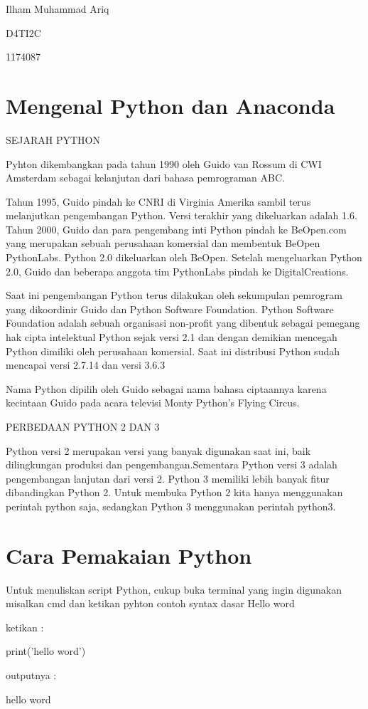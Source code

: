 \documentclass{article}
\begin{document}
Ilham Muhammad Ariq 
\par
D4TI2C
\par
1174087
\section{Mengenal Python dan Anaconda}
\begin{enumerate}
    \item 
{SEJARAH PYTHON}
\par
{Pyhton dikembangkan pada tahun 1990 oleh Guido van Rossum di CWI Amsterdam sebagai kelanjutan dari bahasa pemrograman ABC.}
\par
{Tahun 1995, Guido pindah ke CNRI di Virginia Amerika sambil terus melanjutkan pengembangan Python. Versi terakhir yang dikeluarkan adalah 1.6. Tahun 2000, Guido dan para pengembang inti Python pindah ke BeOpen.com yang merupakan sebuah perusahaan komersial dan membentuk BeOpen PythonLabs. Python 2.0 dikeluarkan oleh BeOpen. Setelah mengeluarkan Python 2.0, Guido dan beberapa anggota tim PythonLabs pindah ke DigitalCreations.
\par
Saat ini pengembangan Python terus dilakukan oleh sekumpulan pemrogram yang dikoordinir Guido dan Python Software Foundation. Python Software Foundation adalah sebuah organisasi non-profit yang dibentuk sebagai pemegang hak cipta intelektual Python sejak versi 2.1 dan dengan demikian mencegah Python dimiliki oleh perusahaan komersial. Saat ini distribusi Python sudah mencapai versi 2.7.14 dan versi 3.6.3
\par
Nama Python dipilih oleh Guido sebagai nama bahasa ciptaannya karena kecintaan Guido pada acara televisi Monty Python's Flying Circus. 
    \item
PERBEDAAN PYTHON 2 DAN 3
\par
Python versi 2 merupakan versi yang banyak digunakan saat ini, baik dilingkungan produksi dan pengembangan.Sementara Python versi 3 adalah pengembangan lanjutan dari versi 2. Python 3 memiliki lebih banyak fitur dibandingkan Python 2. Untuk membuka Python 2 kita hanya menggunakan perintah python saja, sedangkan Python 3 menggunakan perintah python3.
 }   
\end{enumerate}

\section{Cara Pemakaian Python}
\par
Untuk menuliskan script Python, cukup buka terminal yang ingin digunakan misalkan cmd dan ketikan pyhton
contoh syntax dasar Hello word
\par
ketikan :
\par
print('hello word')
\par
outputnya :
\par
hello word
\end{document}
